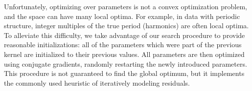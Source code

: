 Unfortunately, optimizing over parameters is not a convex optimization problem, and the space can have many local optima.
For example, in data with periodic structure, integer multiples of the true period (harmonics) are often local optima. 
%
To alleviate this difficulty, we take advantage of our search procedure to provide reasonable initializations: all of the parameters which were part of the previous kernel are initialized to their previous values.
All parameters are then optimized using conjugate gradients, randomly restarting the newly introduced parameters.
This procedure is not guaranteed to find the global optimum, but it implements the commonly used heuristic of iteratively modeling residuals.



